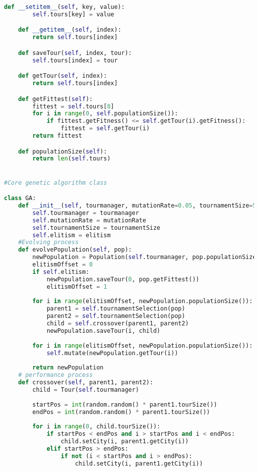\documentclass[12pt]{article}
\begin{document}
\begin{lstlisting}[language=Python]
    def __setitem__(self, key, value):
        self.tours[key] = value

    def __getitem__(self, index):
        return self.tours[index]

    def saveTour(self, index, tour):
        self.tours[index] = tour

    def getTour(self, index):
        return self.tours[index]

    def getFittest(self):
        fittest = self.tours[0]
        for i in range(0, self.populationSize()):
            if fittest.getFitness() <= self.getTour(i).getFitness():
                fittest = self.getTour(i)
        return fittest

    def populationSize(self):
        return len(self.tours)


#Core genetic algorithm class

class GA:
    def __init__(self, tourmanager, mutationRate=0.05, tournamentSize=5, elitism=True):
        self.tourmanager = tourmanager
        self.mutationRate = mutationRate
        self.tournamentSize = tournamentSize
        self.elitism = elitism
    #Evolving process
    def evolvePopulation(self, pop):
        newPopulation = Population(self.tourmanager, pop.populationSize(), False)
        elitismOffset = 0
        if self.elitism:
            newPopulation.saveTour(0, pop.getFittest())
            elitismOffset = 1
        
        for i in range(elitismOffset, newPopulation.populationSize()):
            parent1 = self.tournamentSelection(pop)
            parent2 = self.tournamentSelection(pop)
            child = self.crossover(parent1, parent2)
            newPopulation.saveTour(i, child)
        
        for i in range(elitismOffset, newPopulation.populationSize()):
            self.mutate(newPopulation.getTour(i))
        
        return newPopulation
    # performance process
    def crossover(self, parent1, parent2):
        child = Tour(self.tourmanager)
        
        startPos = int(random.random() * parent1.tourSize())
        endPos = int(random.random() * parent1.tourSize())
        
        for i in range(0, child.tourSize()):
            if startPos < endPos and i > startPos and i < endPos:
                child.setCity(i, parent1.getCity(i))
            elif startPos > endPos:
                if not (i < startPos and i > endPos):
                    child.setCity(i, parent1.getCity(i))
        

\end{lstlisting}
\end{document}

